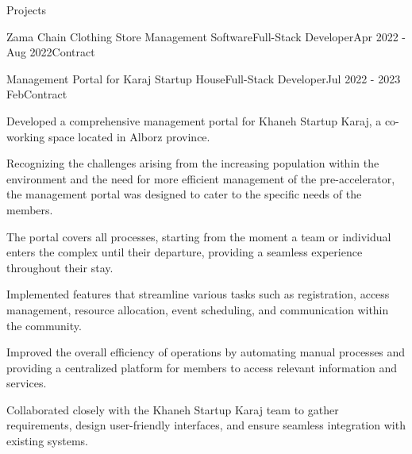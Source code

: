 \documentclass[]{kyvernitis-resume}
\begin{document}
\begin{section}{Projects}
\begin{subsection}{Zama Chain Clothing Store Management Software}{Full-Stack Developer}{Apr 2022 - Aug 2022}{Contract}
    \end{subsection}

\begin{subsection}{Management Portal for Karaj Startup House}{Full-Stack Developer}{Jul 2022 - 2023 Feb}{Contract}
     		\item Developed a comprehensive management portal for Khaneh Startup Karaj, a co-working space located in Alborz province.
		\item Recognizing the challenges arising from the increasing population within the environment and the need for more efficient management of the pre-accelerator, the management portal was designed to cater to the specific needs of the members.
		\item The portal covers all processes, starting from the moment a team or individual enters the complex until their departure, providing a seamless experience throughout their stay.
		\item Implemented features that streamline various tasks such as registration, access management, resource allocation, event scheduling, and communication within the community.
		\item Improved the overall efficiency of operations by automating manual processes and providing a centralized platform for members to access relevant information and services.
		\item Collaborated closely with the Khaneh Startup Karaj team to gather requirements, design user-friendly interfaces, and ensure seamless integration with existing systems.
    \end{subsection}


    
\end{section}




\end{document}
